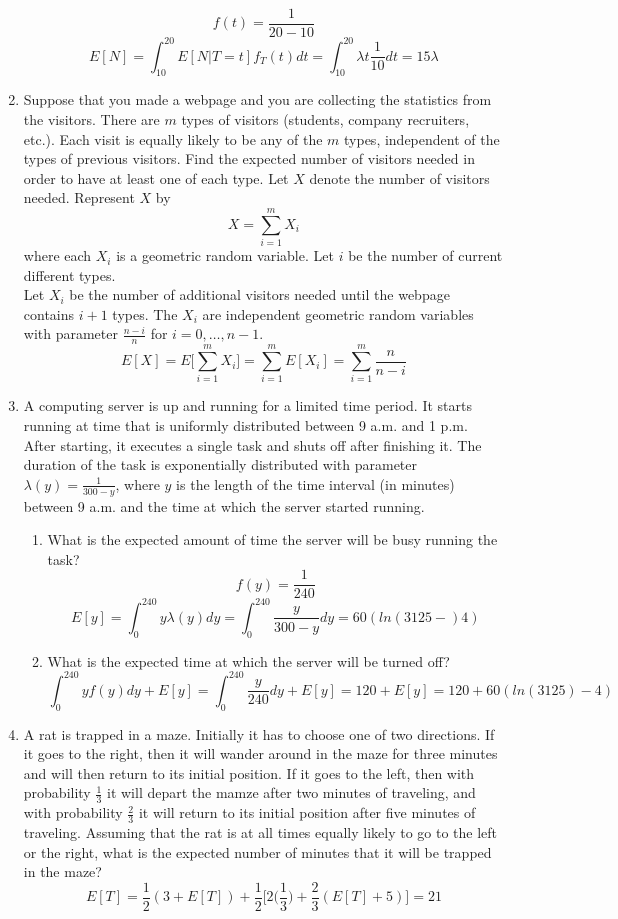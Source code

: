 \documentclass[10.5pt,letterpaper]{article}
\begin{document}
\begin{enumerate}[label=\textbf{Problem \arabic*.}]
\[f(t)=\frac{1}{20-10}\]
\[E[N]=\int_{10}^{20}E[N|T=t]f_T(t)dt = \int_{10}^{20}\lambda t\frac{1}{10}dt=15\lambda\]
\item Suppose that you made a webpage and you are collecting the statistics from the visitors. There are $m$ types of visitors (students, company recruiters, etc.). Each visit is equally likely to be any of the $m$ types, independent of the types of previous visitors. Find the expected number of visitors needed in order to have at least one of each type. Let $X$ denote the number of visitors needed. Represent $X$ by \[X=\sum_{i=1}^{m}X_i\] where each $X_i$ is a geometric random variable.
Let $i$ be the number of current different types.\\
Let $X_i$ be the number of additional visitors needed until the webpage contains $i+1$ types. The $X_i$ are independent geometric random variables with parameter $\frac{n-i}{n}$ for $i=0,\dots,n-1$.
\[E[X]=E\bigg[\sum_{i=1}^{m}X_i\bigg]=\sum_{i=1}^{m}E[X_i]=\sum_{i=1}^{m}\frac{n}{n-i}\]
\item A computing server is up and running for a limited time period. It starts running at time that is uniformly distributed between 9 a.m. and 1 p.m. After starting, it executes a single task and shuts off after finishing it. The duration of the task is exponentially distributed with parameter $\lambda(y)=\frac{1}{300-y}$, where $y$ is the length of the time interval (in minutes) between 9 a.m. and the time at which the server started running.
	\begin{enumerate}[label=\alph*)]
	\item What is the expected amount of time the server will be busy running the task?
	\[f(y)=\frac{1}{240}\]
	\[E[y]=\int_{0}^{240}y\lambda(y)dy = \int_{0}^{240}\frac{y}{300-y}dy=60(ln(3125-)4)\]
	\item What is the expected time at which the server will be turned off?
	\[\int_{0}^{240}yf(y)dy + E[y] = \int_{0}^{240}\frac{y}{240}dy + E[y] = 120 + E[y] = 120 + 60(ln(3125)-4)\]
	\end{enumerate}
\item A rat is trapped in a maze. Initially it has to choose one of two directions. If it goes to the right, then it will wander around in the maze for three minutes and will then return to its initial position. If it goes to the left, then with probability $\frac{1}{3}$ it will depart the mamze after two minutes of traveling, and with probability $\frac{2}{3}$ it will return to its initial position after five minutes of traveling. Assuming that the rat is at all times equally likely to go to the left or the right, what is the expected number of minutes that it will be trapped in the maze?
\[E[T]=\frac{1}{2}(3+E[T])+\frac{1}{2}\bigg[2\bigg(\frac{1}{3}\bigg)+\frac{2}{3}(E[T]+5)\bigg] = 21\]
\end{enumerate}
\end{document}
